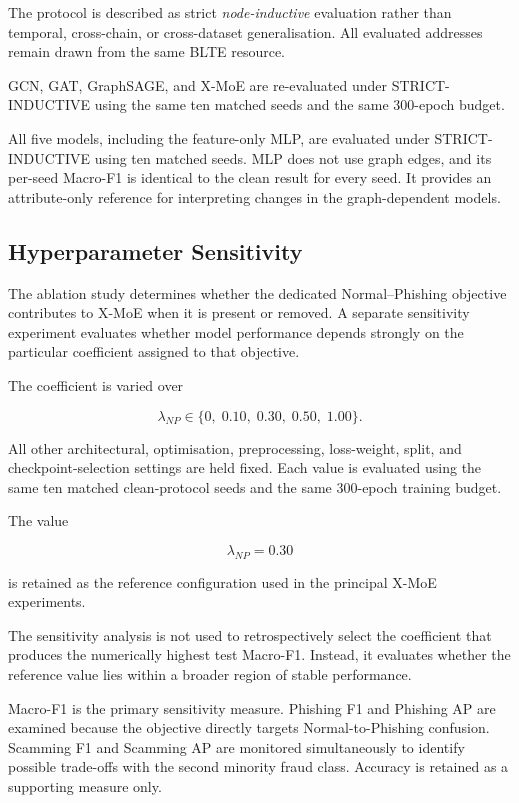 \documentclass{ieeeaccess}
\begin{document}
The protocol is described as strict \textit{node-inductive} evaluation rather than temporal, cross-chain, or cross-dataset generalisation. All evaluated addresses remain drawn from the same BLTE resource.

GCN, GAT, GraphSAGE, and X-MoE are re-evaluated under STRICT-INDUCTIVE using the same ten matched seeds and the same 300-epoch budget.

All five models, including the feature-only MLP, are evaluated under STRICT-INDUCTIVE using ten matched seeds. MLP does not use graph edges, and its per-seed Macro-F1 is identical to the clean result for every seed. It provides an attribute-only reference for interpreting changes in the graph-dependent models.


\subsection{Hyperparameter Sensitivity}

The ablation study determines whether the dedicated Normal--Phishing objective contributes to X-MoE when it is present or removed. A separate sensitivity experiment evaluates whether model performance depends strongly on the particular coefficient assigned to that objective.

The coefficient is varied over

\begin{equation}
\lambda_{NP}
\in
\{0,\;0.10,\;0.30,\;0.50,\;1.00\}.
\label{eq:lambda_np_sensitivity}
\end{equation}

All other architectural, optimisation, preprocessing, loss-weight, split, and checkpoint-selection settings are held fixed. Each value is evaluated using the same ten matched clean-protocol seeds and the same 300-epoch training budget.

The value

\begin{equation}
\lambda_{NP}=0.30
\end{equation}

is retained as the reference configuration used in the principal X-MoE experiments.

The sensitivity analysis is not used to retrospectively select the coefficient that produces the numerically highest test Macro-F1. Instead, it evaluates whether the reference value lies within a broader region of stable performance.

Macro-F1 is the primary sensitivity measure. Phishing F1 and Phishing AP are examined because the objective directly targets Normal-to-Phishing confusion. Scamming F1 and Scamming AP are monitored simultaneously to identify possible trade-offs with the second minority fraud class. Accuracy is retained as a supporting measure only.
\end{document}
